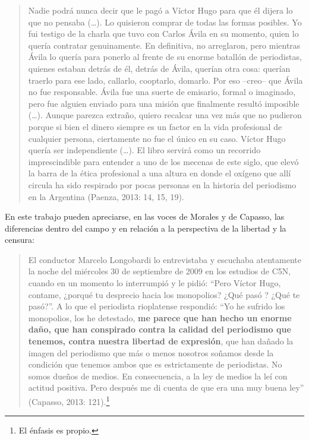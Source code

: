 \begin{quote}
Nadie podrá nunca decir que le pagó a Víctor Hugo para que él dijera lo que no pensaba (\ldots). Lo quisieron comprar de todas las formas posibles. Yo fui testigo de la charla que tuvo con Carlos Ávila en su momento, quien lo quería contratar genuinamente. En definitiva, no arreglaron, pero mientras Ávila lo quería para ponerlo al frente de su enorme batallón de periodistas, quienes estaban detrás de él, detrás de Ávila, querían otra cosa: querían traerlo para ese lado, callarlo, cooptarlo, domarlo. Por eso --creo-- que Ávila no fue responsable. Ávila fue una suerte de emisario, formal o imaginado, pero fue alguien enviado para una misión que finalmente resultó imposible (\ldots). Aunque parezca extraño, quiero recalcar una vez más que no pudieron porque si bien el dinero siempre es un factor en la vida profesional de cualquier persona, ciertamente no fue el único en su caso. Víctor Hugo quería ser independiente (\ldots). El libro servirá como un recorrido imprescindible para entender a uno de los mecenas de este siglo, que elevó la barra de la ética profesional a una altura en donde el oxígeno que allí circula ha sido respirado por pocas personas en la historia del periodismo en la Argentina (Paenza, 2013: 14, 15, 19).
\end{quote}

En este trabajo pueden apreciarse, en las voces de Morales y de Capasso, las diferencias dentro del campo y en relación a la perspectiva de la libertad y la censura:

\begin{quote}
El conductor Marcelo Longobardi lo entrevistaba y escuchaba atentamente la noche del miércoles 30 de septiembre de 2009 en los estudios de C5N, cuando en un momento lo interrumpió y le pidió: ``Pero Víctor Hugo, contame, ¿porqué tu desprecio hacia los monopolios? ¿Qué pasó ? ¿Qué te pasó?''. A lo que el periodista rioplatense respondió: ``Yo he sufrido los monopolios, los he detestado, \textbf{me parece que han hecho un enorme daño, que han conspirado contra la calidad del periodismo que tenemos, contra nuestra libertad de expresión}, que han dañado la imagen del periodismo que más o menos nosotros soñamos desde la condición que tenemos ambos que es estrictamente de periodistas. No somos dueños de medios. En consecuencia, a la ley de medios la leí con actitud positiva. Pero después me di cuenta de que era una muy buena ley'' (Capasso, 2013: 121).\footnote{El énfasis es propio.}
\end{quote}

